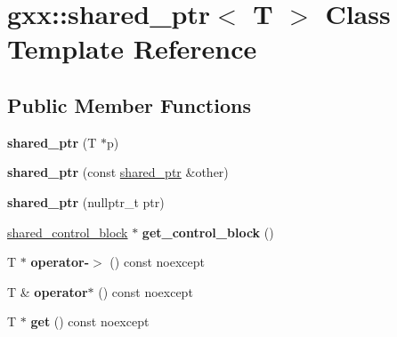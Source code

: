 \hypertarget{classgxx_1_1shared__ptr}{}\section{gxx\+:\+:shared\+\_\+ptr$<$ T $>$ Class Template Reference}
\label{classgxx_1_1shared__ptr}
\subsection*{Public Member Functions}
\begin{DoxyCompactItemize}
\item 
{\bfseries shared\+\_\+ptr} (T $\ast$p)\hypertarget{classgxx_1_1shared__ptr_adadbc071e9a7c6c0f54652f311611d4e}{}\label{classgxx_1_1shared__ptr_adadbc071e9a7c6c0f54652f311611d4e}

\item 
{\bfseries shared\+\_\+ptr} (const \hyperlink{classgxx_1_1shared__ptr}{shared\+\_\+ptr} \&other)\hypertarget{classgxx_1_1shared__ptr_aef4ea79045c4a7d11c711764dd5045c1}{}\label{classgxx_1_1shared__ptr_aef4ea79045c4a7d11c711764dd5045c1}

\item 
{\bfseries shared\+\_\+ptr} (nullptr\+\_\+t ptr)\hypertarget{classgxx_1_1shared__ptr_a668f6546e14c80c5107800676dc36271}{}\label{classgxx_1_1shared__ptr_a668f6546e14c80c5107800676dc36271}

\item 
\hyperlink{classgxx_1_1shared__control__block}{shared\+\_\+control\+\_\+block} $\ast$ {\bfseries get\+\_\+control\+\_\+block} ()\hypertarget{classgxx_1_1shared__ptr_a8270a13348c5dd42bed43905aa6889d5}{}\label{classgxx_1_1shared__ptr_a8270a13348c5dd42bed43905aa6889d5}

\item 
T $\ast$ {\bfseries operator-\/$>$} () const noexcept\hypertarget{classgxx_1_1shared__ptr_a3e42b457b7d138ca0003579980d3dcdb}{}\label{classgxx_1_1shared__ptr_a3e42b457b7d138ca0003579980d3dcdb}

\item 
T \& {\bfseries operator$\ast$} () const noexcept\hypertarget{classgxx_1_1shared__ptr_a6ab46b46033b94792b8dc03fd5991433}{}\label{classgxx_1_1shared__ptr_a6ab46b46033b94792b8dc03fd5991433}

\item 
T $\ast$ {\bfseries get} () const noexcept\hypertarget{classgxx_1_1shared__ptr_a451b2e84191100f66a45f20da54970eb}{}\label{classgxx_1_1shared__ptr_a451b2e84191100f66a45f20da54970eb}


\end{DoxyCompactItemize}
